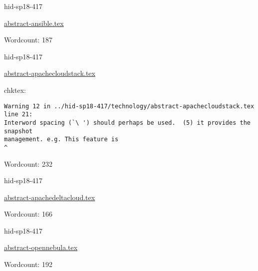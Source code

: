 

\begin{IU}

hid-sp18-417

\href{https://github.com/cloudmesh-community/hid-sp18-417/blob/master//technology/abstract-ansible.tex}{abstract-ansible.tex}

 

Wordcount: 187

\end{IU}



\begin{IU}

hid-sp18-417

\href{https://github.com/cloudmesh-community/hid-sp18-417/blob/master//technology/abstract-apachecloudstack.tex}{abstract-apachecloudstack.tex}

 
chktex:
\begin{tiny}
\begin{verbatim}
Warning 12 in ../hid-sp18-417/technology/abstract-apachecloudstack.tex line 21:
Interword spacing (`\ ') should perhaps be used.  (5) it provides the snapshot
management. e.g. This feature is                                             ^
\end{verbatim}
\end{tiny}

Wordcount: 232

\end{IU}



\begin{IU}

hid-sp18-417

\href{https://github.com/cloudmesh-community/hid-sp18-417/blob/master//technology/abstract-apachedeltacloud.tex}{abstract-apachedeltacloud.tex}

 

Wordcount: 166

\end{IU}



\begin{IU}

hid-sp18-417

\href{https://github.com/cloudmesh-community/hid-sp18-417/blob/master//technology/abstract-opennebula.tex}{abstract-opennebula.tex}

 

Wordcount: 192

\end{IU}

